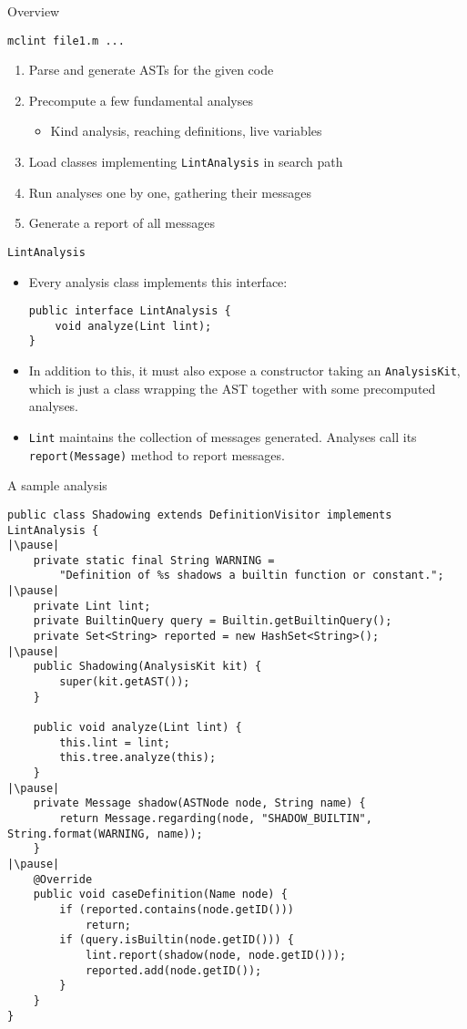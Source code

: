 \documentclass{beamer}
\begin{document}
\begin{frame}{Overview}

{\tt mclint file1.m ...}
\begin{enumerate}
\item Parse and generate ASTs for the given code
\item Precompute a few fundamental analyses
    \begin{itemize}
    \item Kind analysis, reaching definitions, live variables
    \end{itemize}
\item Load classes implementing {\tt LintAnalysis} in search path
\item Run analyses one by one, gathering their messages
\item Generate a report of all messages
\end{enumerate}
\end{frame}

\begin{frame}[fragile]{{\tt LintAnalysis}}
\begin{itemize}
\item Every analysis class implements this interface:
\begin{lstlisting}[basicstyle=\ttfamily, lang=java]
public interface LintAnalysis {
    void analyze(Lint lint);
}
\end{lstlisting}
\item In addition to this, it must also expose a constructor taking an
{\tt AnalysisKit}, which is just a class wrapping the AST together with
some precomputed analyses.
\item {\tt Lint} maintains the collection of messages generated. Analyses
call its {\tt report(Message)} method to report messages.
\end{itemize}
\end{frame}

\begin{frame}[fragile]{A sample analysis}
\begin{lstlisting}
public class Shadowing extends DefinitionVisitor implements LintAnalysis {
|\pause|
    private static final String WARNING = 
        "Definition of %s shadows a builtin function or constant.";
|\pause|
    private Lint lint;
    private BuiltinQuery query = Builtin.getBuiltinQuery();
    private Set<String> reported = new HashSet<String>();
|\pause|
    public Shadowing(AnalysisKit kit) {
        super(kit.getAST());
    }

    public void analyze(Lint lint) {
        this.lint = lint;
        this.tree.analyze(this);
    }
|\pause|
    private Message shadow(ASTNode node, String name) {
        return Message.regarding(node, "SHADOW_BUILTIN", String.format(WARNING, name));
    }
|\pause|
    @Override
    public void caseDefinition(Name node) {
        if (reported.contains(node.getID()))
            return;
        if (query.isBuiltin(node.getID())) {
            lint.report(shadow(node, node.getID()));
            reported.add(node.getID());
        }
    }
}
\end{lstlisting}
\end{frame}
\end{document}

